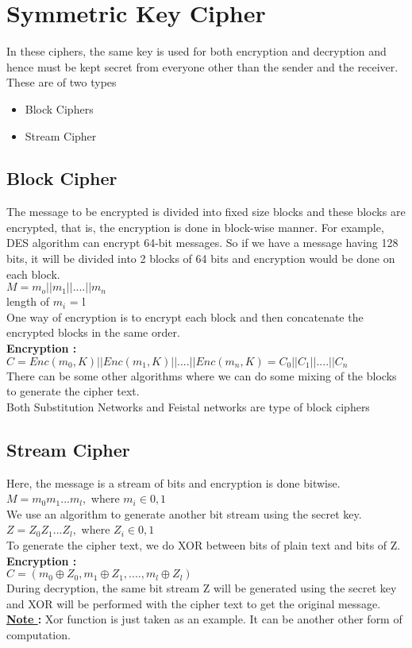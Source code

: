 \documentclass[11pt]{article}
\begin{document}
\section{Symmetric Key Cipher}
In these ciphers, the same key is used for both encryption and decryption and hence must be kept secret from everyone other than the sender and the receiver. These are of two types
\begin{itemize}
    \item Block Ciphers
    \item Stream Cipher
\end{itemize}
\subsection{Block Cipher}
The message to be encrypted is divided into fixed size blocks and these blocks are encrypted, that is, the encryption is done in block-wise manner. For example, DES algorithm can encrypt 64-bit messages. So if we have a message having 128 bits, it will be divided into 2 blocks of 64 bits and encryption would be done on each block.\\
$M = m_o||m_1||....||m_n$\\
    length of $m_i$ = l\\
One way of encryption is to encrypt each block and then concatenate the encrypted blocks in the same order.\\
\textbf{Encryption :}\\
$C = Enc(m_0, K) || Enc(m_1, K) || .... || Enc(m_n, K) = C_0 || C_1 || .... || C_n$\\
There can be some other algorithms where we can do some mixing of the blocks to generate the cipher text.\\
Both Substitution Networks and Feistal networks are type of  block ciphers
\subsection{Stream Cipher}
Here, the message is a stream of bits and encryption is done bitwise. 
$M = m_0m_1...m_l,$ where $ m_i \in {0, 1}$\\
We use an algorithm to generate another bit stream using the secret key.\\
$Z = Z_0Z_1...Z_l,$ where $ Z_i \in {0, 1}$\\
To generate the cipher text, we do XOR between bits of plain text and bits of Z.\\
\textbf{Encryption : }\\
$C = (m_0 \oplus Z_0, m_1 \oplus Z_1,...., m_l \oplus Z_l)$\\
During decryption, the same bit stream Z will be generated using the secret key and XOR will be performed with the cipher text to get the original message.\\
\textbf{\underline{Note }:} Xor function is just taken as an example. It can be another other form of computation.
\end{document}
